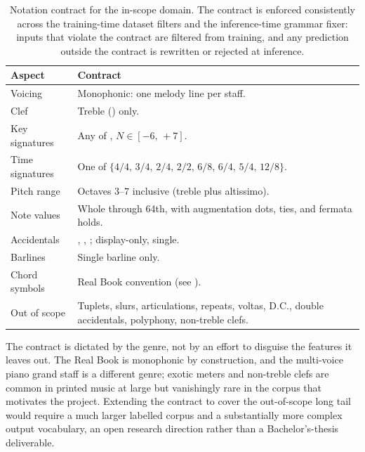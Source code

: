\begin{table}[ht]
\centering
\caption[Notation contract for the target domain.]{%
Notation contract for the in-scope domain.
The contract is enforced consistently across the training-time dataset
filters and the inference-time grammar fixer: inputs that violate the
contract are filtered from training, and any prediction outside the
contract is rewritten or rejected at inference.}
\label{tab:domain-contract}
\small
\begin{tabularx}{\linewidth}{@{}lL@{}}
\toprule
\textbf{Aspect} & \textbf{Contract} \\
\midrule
Voicing & Monophonic: one melody line per staff. \\
\tfgrowsep
Clef & Treble () only. \\
\tfgrowsep
Key signatures & Any of , $N \in [-6,\,+7]$. \\
\tfgrowsep
Time signatures & One of $\{4/4,\,3/4,\,2/4,\,2/2,\,6/8,\,6/4,\,5/4,\,12/8\}$. \\
\tfgrowsep
Pitch range & Octaves $3$--$7$ inclusive (treble plus altissimo). \\
\tfgrowsep
Note values & Whole through 64th, with augmentation dots, ties, and fermata holds. \\
\tfgrowsep
Accidentals & , , ; display-only, single. \\
\tfgrowsep
Barlines & Single barline only. \\
\tfgrowsep
Chord symbols & Real Book convention (see ). \\
\tfgrowsep
Out of scope & Tuplets, slurs, articulations, repeats, voltas, D.C., double accidentals, polyphony, non-treble clefs. \\
\bottomrule
\end{tabularx}
\end{table}

The contract is dictated by the genre, not by an effort to disguise the
features it leaves out. The Real Book is monophonic by construction, and the
multi-voice piano grand staff is a different genre; exotic meters and
non-treble clefs are common in printed music at large but vanishingly
rare in the corpus that motivates the project.
Extending the contract to cover the out-of-scope long tail would require
a much larger labelled corpus and a substantially more complex output
vocabulary, an open research direction rather than a Bachelor's-thesis
deliverable.


